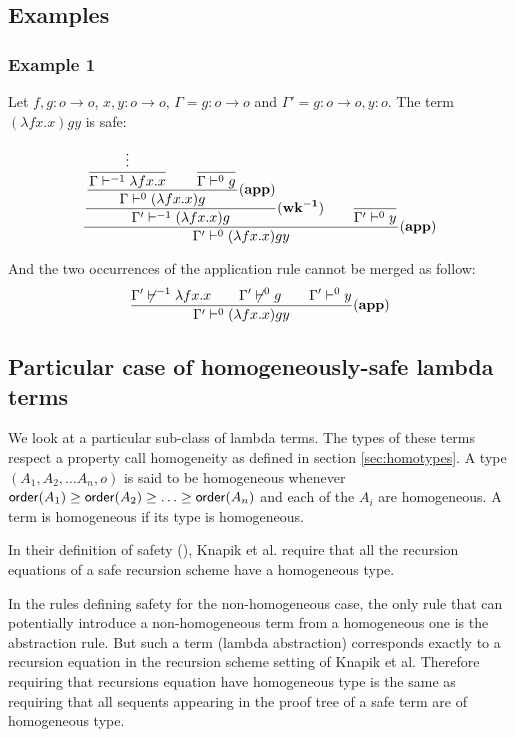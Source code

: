 \subsection{Examples}
\subsubsection{Example 1}
Let $f,g:o\rightarrow o$, $x,y:o\rightarrow
o$, $\Gamma = g:o\rightarrow o$ and $\Gamma' = g:o\rightarrow o,
y:o$. The term $(\lambda f x . x) g y $ is safe:


$$ \frac{\displaystyle 
        \frac{\displaystyle 
            \frac{\displaystyle 
                \frac{\displaystyle \vdots}{\Gamma \vdash^{-1} \lambda f x. x}      \qquad \frac{\displaystyle}{\Gamma \vdash^0 g} }{\Gamma \vdash^0 (\lambda f x. x) g} \mathbf{(app)}
        }{ \Gamma' \vdash^{-1} (\lambda f x. x) g } \mathbf{(wk^{-1})}
        \qquad \frac{\displaystyle}{\Gamma' \vdash^0 y}
    }{ \Gamma' \vdash^0 (\lambda f x. x) g y } \mathbf{(app)}
$$


And the two occurrences of the application rule cannot be merged as
follow:
$$ \frac{\displaystyle {\Gamma' \not\vdash^{-1} \lambda f x. x} \qquad \Gamma' \not\vdash^0 g \qquad \Gamma' \vdash^0 y}{\Gamma' \vdash^0 (\lambda f x. x) g y } \mathbf{(app)}$$


\subsection{Particular case of homogeneously-safe lambda terms}

We look at a particular sub-class of lambda terms. The types of
these terms respect a property call homogeneity as defined in
section \ref{sec:homotypes}. A type $(A_1, A_2, \ldots A_n, o)$ is
said to be homogeneous whenever ${\sf order}(A_1) \geq {\sf order}(A_2) \geq
\ldots \geq  {\sf order}(A_n)$ and each of the $A_i$ are homogeneous. A
term is homogeneous if its type is homogeneous.


In their definition of safety (\cite{KNU02}), Knapik et al. require
that all the recursion equations of a safe recursion scheme have a
homogeneous type.

In the rules defining safety for the non-homogeneous case, the only
rule that can potentially introduce a non-homogeneous term from a
homogeneous one is the abstraction rule. But such a term (lambda
abstraction) corresponds exactly to a recursion equation in the
recursion scheme setting of Knapik et al. Therefore requiring that
recursions equation have homogeneous type is the same as requiring
that all sequents appearing in the proof tree of a safe term are of
homogeneous type.


